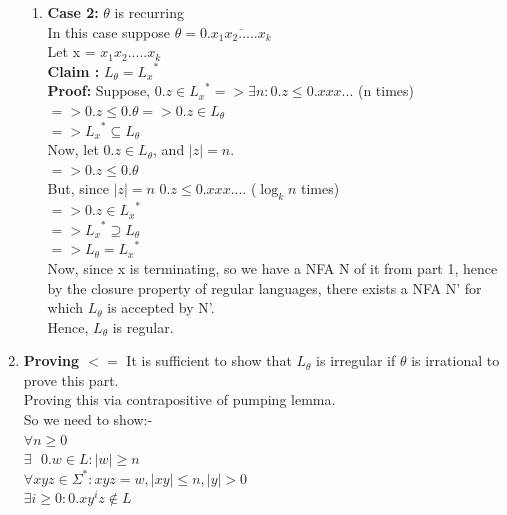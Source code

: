 \documentclass{article}
\begin{document}
\begin{enumerate}
\begin{enumerate}
            \item \textbf{Case 2: } $\theta $ is recurring\\
            
            In this case suppose  $\theta = 0.\overline{x_1x_2.....x_k}$ \\
            Let x = $x_1x_2.....x_k$\\
            \textbf{Claim : }  $L_\theta = {L_x}^*$\\
            \textbf{Proof:}  
            Suppose, $0.z \in {L_x}^* => \exists n : 0.z \leq 0.xxx... $ (n times)\\
            $=> 0.z \leq 0.\theta => 0.z \in L_\theta$\\
            $=> {L_x}^* \subseteq L_\theta$\\
            
            Now, let $0.z \in L_\theta$, and $|z| = n$.\\
            $=> 0.z \leq 0.\theta$\\
            But, since $|z| = n$ $0.z \leq 0.xxx....$ ($\log_k n$ times)\\
            $=> 0.z \in {L_x}^*$\\
            $=> {L_x}^* \supseteq L_\theta$\\

            $=> L_\theta = {L_x}^*$\\

            Now, since x is terminating, so we have a NFA N of it from part 1, hence by the closure property of regular languages, there exists a 
            NFA N' for which $L_\theta$ is accepted by N'.\\
            Hence, $L_\theta$ is regular.\\
        \end{enumerate}

        \item \textbf{Proving $<=$}
        It is sufficient to show that $L_{\theta}$ is irregular if $\theta$ is irrational to prove this part.\\
        Proving this via contrapositive of pumping lemma.\\
        So we need to show:-\\
        $\forall n \geq 0$\\
        $\exists \text{ } 0.w \in L : |w| \geq n$\\
        $\forall xyz \in \Sigma^* : xyz = w, |xy| \leq n, |y| > 0$\\
        $\exists i \geq 0 : 0.xy^iz \notin L$\\


\end{enumerate}
\end{document}
